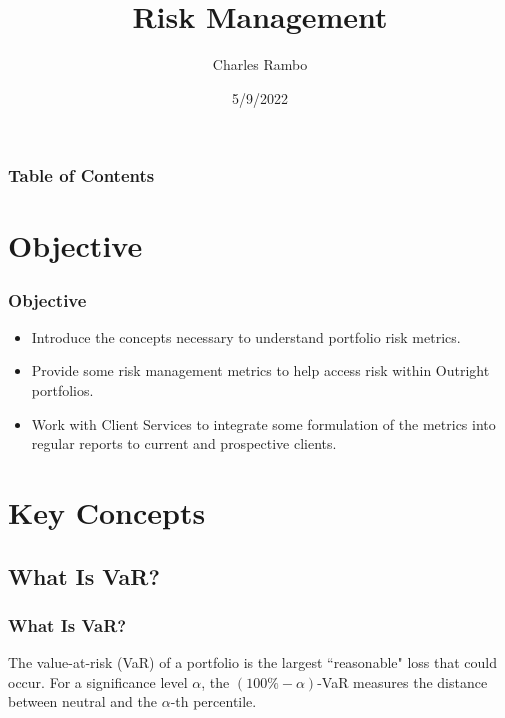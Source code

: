 \documentclass{beamer}
\title{Risk Management}
\author{Charles Rambo}
\date{5/9/2022}
\begin{document}
\frame{\titlepage}

\begin{frame}
\frametitle{Table of Contents}
\tableofcontents
\end{frame}

\section{Objective}

\begin{frame}
\frametitle{Objective}
\begin{itemize}
\item Introduce the concepts necessary to understand portfolio risk metrics.
\item Provide some risk management metrics to help access risk within Outright portfolios. 
\item Work with Client Services to integrate some formulation of the metrics into regular reports to current and prospective clients.
\end{itemize}
\end{frame}


\section{Key Concepts}

\subsection{What Is VaR?}

\begin{frame}
\frametitle{What Is VaR?}
The value-at-risk (VaR) of a portfolio is the largest  ``reasonable" loss that could occur. For a significance level $\alpha$, the $(100\% - \alpha)$-VaR measures the distance between neutral and the $\alpha$-th percentile.
\bigskip

\begin{center}


\end{center}

\end{frame}
\end{document}
